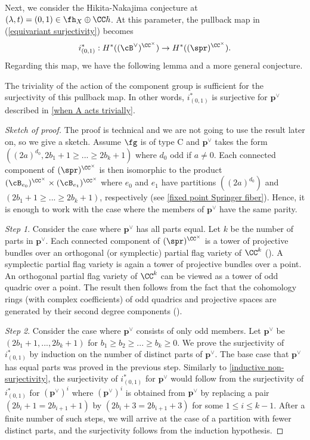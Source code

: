 \documentclass[12pt]{amsart}
\begin{document}
Next, we consider the Hikita-Nakajima conjecture at $(\lambda, t)= (0,1)\in \fh_X\oplus \CC\hbar$. At this parameter, the pullback map in (\ref{equivariant surjectivity}) becomes 
$$i^{*}_{(0,1)}: H^*((\cB^\vee)^{\CC^\times})\rightarrow H^*((\spr)^{\CC^\times}).$$
Regarding this map, we have the following lemma and a more general conjecture.
\begin{lemma} \label{sujective Ctimes}
    The triviality of the action of the component group is sufficient for the surjectivity of this pullback map. In other words, $i^{*}_{(0,1)}$ is surjective for $\mathbf{p}^\vee$ described in \cref{when A acts trivially}.
\end{lemma}
\begin{proof}[Sketch of proof] The proof is technical and we are not going to use the result later on, so we give a sketch. Assume $\fg$ is of type C and $\mathbf{p}^\vee$ takes the form $((2a)^{d_0}, 2b_1+1\geqslant...\geqslant 2b_k+1)$ where $d_0$ odd if $a\neq 0$. Each connected component of $(\spr)^{\CC^\times}$ is then isomorphic to the product $(\cB_{e_0})^{\CC^\times}\times (\cB_{e_1})^{\CC^\times}$ where $e_0$ and $e_1$ have partitions $((2a)^{d_0})$ and $(2b_1+1\geqslant...\geqslant 2b_k+1)$, respectively (see \cref{fixed point Springer fiber}). Hence, it is enough to work with the case where the members of $\mathbf{p}^\vee$ have the same parity.

\textit{Step 1}. Consider the case where $\mathbf{p}^\vee$ has all parts equal. Let $k$ be the number of parts in $\mathbf{p}^\vee$. Each connected component of $(\spr)^{\CC^\times}$ is a tower of projective bundles over an orthogonal (or symplectic) partial flag variety of $\CC^k$ (\cite[Section 8.3]{hoang2024}). A symplectic partial flag variety is again a tower of projective bundles over a point. An orthogonal partial flag variety of $\CC^k$ can be viewed as a tower of odd quadric over a point. The result then follows from the fact that the cohomology rings (with complex coefficients) of odd quadrics and projective spaces are generated by their second degree components (\cite{EG94}).

\textit{Step 2}. Consider the case where $\mathbf{p}^\vee$ consists of only odd members. Let $\mathbf{p}^\vee$ be $(2b_1+1,...,2b_k+1)$ for $b_1\geqslant b_2\geqslant...\geqslant b_k\geqslant 0$. We prove the surjectivity of $i^{*}_{(0,1)}$ by induction on the number of distinct parts of $\mathbf{p}^\vee$. The base case that $\mathbf{p}^\vee$ has equal parts was proved in the previous step. Similarly to \cref{inductive non-surjectivity}, the surjectivity of $i^{*}_{(0,1)}$ for $\mathbf{p}^\vee$ would follow from the surjectivity of $i^{*}_{(0,1)}$ for $(\mathbf{p}^\vee)^i$ where $(\mathbf{p}^\vee)^i$ is obtained from $\mathbf{p}^\vee$ by replacing a pair $(2b_i+1= 2b_{i+1}+1)$ by $(2b_i+3= 2b_{i+1}+3)$ for some $1\leqslant i\leqslant k-1$. After a finite number of such steps, we will arrive at the case of a partition with fewer distinct parts, and the surjectivity follows from the induction hypothesis.
    
\end{proof}
    
\end{document}
